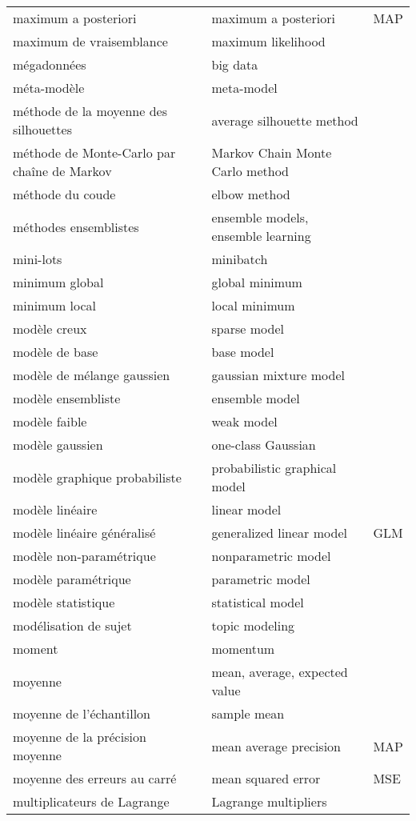 \begin{longtable}{p{} p{} p{}}
maximum a posteriori & maximum a posteriori & MAP \\ 
maximum de vraisemblance & maximum likelihood &  \\ 
mégadonnées & big data &  \\ 
méta-modèle & meta-model &  \\ 
méthode de la moyenne des silhouettes & average silhouette method &  \\ 
méthode de Monte-Carlo par chaîne de Markov & Markov Chain Monte Carlo method &  \\ 
méthode du coude & elbow method &  \\ 
méthodes ensemblistes & ensemble models, ensemble learning &  \\ 
mini-lots & minibatch &  \\ 
minimum global & global minimum &  \\ 
minimum local & local minimum &  \\ 
modèle creux & sparse model &  \\ 
modèle de base & base model &  \\ 
modèle de mélange gaussien & gaussian mixture model &  \\ 
modèle ensembliste & ensemble model &  \\ 
modèle faible & weak model &  \\ 
modèle gaussien & one-class Gaussian &  \\ 
modèle graphique probabiliste & probabilistic graphical model &  \\ 
modèle linéaire & linear model &  \\ 
modèle linéaire généralisé & generalized linear model & GLM \\ 
modèle non-paramétrique & nonparametric model &  \\ 
modèle paramétrique & parametric model &  \\ 
modèle statistique & statistical model &  \\ 
modélisation de sujet & topic modeling &  \\ 
moment & momentum &  \\ 
moyenne & mean, average, expected value &  \\ 
moyenne de l’échantillon & sample mean &  \\ 
moyenne de la précision moyenne & mean average precision & MAP \\ 
moyenne des erreurs au carré & mean squared error & MSE \\ 
multiplicateurs de Lagrange & Lagrange multipliers &  \\ 

\end{longtable}
